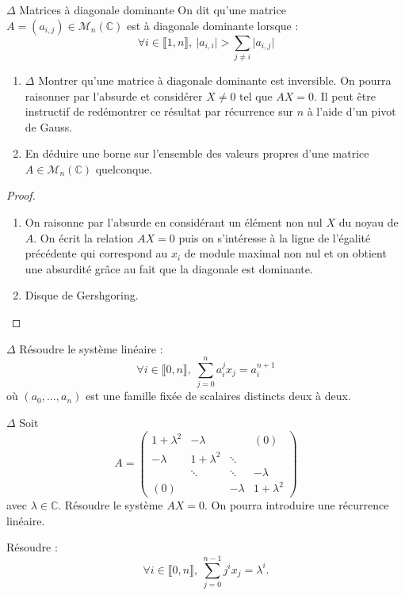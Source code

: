 \documentclass[french,a4paper]{article}
\newcommand{\C}{\mathbb{C}}
\theoremstyle{plain}
\theoremstyle{definition}
\theoremstyle{remark}
\begin{document}
\begin{ex}{$\Delta$ Matrices à diagonale dominante}
	On dit qu'une matrice $A=(a_{i,j})\in\mathcal{M}_n(\C)$ est à diagonale dominante lorsque : $$\forall i\in\llbracket 1,n\rrbracket,\ \lvert a_{i,i}\rvert>\sum_{j\ne i}\lvert a_{i,j}\rvert$$
	\begin{enumerate}
		\item $\Delta$ Montrer qu'une matrice à diagonale dominante est inversible. On pourra raisonner par l'absurde et considérer $X\ne 0$ tel que $AX=0$. Il peut être instructif de redémontrer ce résultat par récurrence sur $n$ à l'aide d'un pivot de Gauss.
		\item En déduire une borne sur l'ensemble des valeurs propres d'une matrice $A\in\mathcal{M}_n(\C)$ quelconque.
	\end{enumerate}
\end{ex}
\begin{proof}
	\begin{enumerate}
		\item On raisonne par l'absurde en considérant un élément non nul $X$ du noyau de $A$. On écrit la relation $AX=0$ puis on s'intéresse à la ligne de l'égalité précédente qui correspond au $x_i$ de module maximal non nul et on obtient une absurdité grâce au fait que la diagonale est dominante.
		\item Disque de Gershgoring.
	\end{enumerate}
\end{proof}

\begin{ex}{$\Delta$}
	Résoudre le système linéaire : $$\forall i\in\llbracket0,n\rrbracket,\ \sum_{j=0}^{n}a_i^jx_j=a_i^{n+1}$$ où $(a_0,\ldots,a_n)$ est une famille fixée de scalaires distincts deux à deux.
\end{ex}

\begin{ex}{$\Delta$}
	Soit $$A=\begin{pmatrix}
		1+\lambda^2&-\lambda&&(0)\\
		-\lambda&1+\lambda^2&\ddots&\\
		&\ddots&\ddots&-\lambda\\
		(0)&&-\lambda&1+\lambda^2
	\end{pmatrix}$$ avec $\lambda\in\C$. Résoudre le système $AX=0$. On pourra introduire une récurrence linéaire.
\end{ex}

\begin{ex}{}
	Résoudre : $$\forall i\in\llbracket0,n\rrbracket,\ \sum_{j=0}^{n-1}j^ix_j=\lambda^i.$$
\end{ex}
\end{document}
